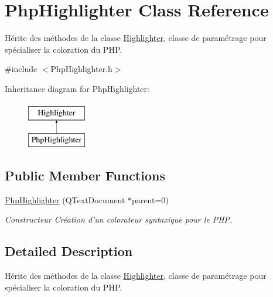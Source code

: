\hypertarget{class_php_highlighter}{
\section{PhpHighlighter Class Reference}
\label{class_php_highlighter}
}


Hérite des méthodes de la classe \hyperlink{class_highlighter}{Highlighter}, classe de paramétrage pour spécialiser la coloration du PHP.  




{\ttfamily \#include $<$PhpHighlighter.h$>$}

Inheritance diagram for PhpHighlighter:\begin{figure}[H]
\begin{center}
\leavevmode
\includegraphics[height=2.000000cm]{class_php_highlighter}
\end{center}
\end{figure}
\subsection*{Public Member Functions}
\begin{DoxyCompactItemize}
\item 
\hyperlink{class_php_highlighter_abf9e9be6b345775eed0a094dfb5e8de6}{PhpHighlighter} (QTextDocument $\ast$parent=0)
\begin{DoxyCompactList}\small\item\em Constructeur Création d'un colorateur syntaxique pour le PHP. \item\end{DoxyCompactList}\end{DoxyCompactItemize}


\subsection{Detailed Description}
Hérite des méthodes de la classe \hyperlink{class_highlighter}{Highlighter}, classe de paramétrage pour spécialiser la coloration du PHP. 

